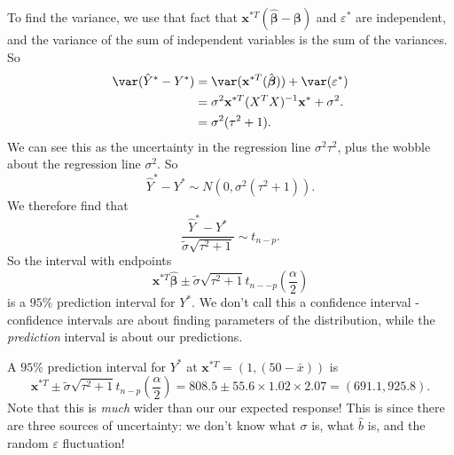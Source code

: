 \documentclass[a4paper]{article}
\begin{document}
To find the variance, we use that fact that $\mathbf{x}^{*T}(\hat{\boldsymbol\beta} - \boldsymbol\beta)$ and $\varepsilon^*$ are independent, and the variance of the sum of independent variables is the sum of the variances. So
\begin{align*}
  \var(\hat{Y}^* - Y^*) &= \var (\mathbf{x}^{*T}(\hat{\boldsymbol\beta})) + \var (\varepsilon^*)\\
  &= \sigma^2 \mathbf{x}^{*T}(X^TX)^{-1}\mathbf{x}^* + \sigma^2.\\
  &= \sigma^2(\tau^2 + 1).
\end{align*}
We can see this as the uncertainty in the regression line $\sigma^2\tau^2$, plus the wobble about the regression line $\sigma^2$. So
\[
  \hat{Y}^* - Y^* \sim N(0, \sigma^2(\tau^2 + 1)).
\]
We therefore find that
\[
  \frac{\hat{Y}^* - Y^*}{\tilde{\sigma}\sqrt{\tau^2 + 1}} \sim t_{n - p}.
\]
So the interval with endpoints
\[
  \mathbf{x}^{*T}\hat{\boldsymbol\beta} \pm \tilde{\sigma}\sqrt{\tau^2 + 1}t_{n- - p}\left(\frac{\alpha}{2}\right)
\]
is a $95\%$ prediction interval for $Y^*$. We don't call this a confidence interval - confidence intervals are about finding parameters of the distribution, while the \emph{prediction} interval is about our predictions.

\begin{eg}
  A $95\%$ prediction interval for $Y^*$ at $\mathbf{x}^{*T} = (1, (50 - \bar x))$ is
  \[
    \mathbf{x}^{*T}\pm \tilde{\sigma}\sqrt{\tau^2 + 1}t_{n - p}\left(\frac{\alpha}{2}\right) = 808.5\pm 55.6 \times 1.02 \times 2.07 = (691.1, 925.8).
  \]
  Note that this is \emph{much} wider than our our expected response! This is since there are three sources of uncertainty: we don't know what $\sigma$ is, what $\hat{b}$ is, and the random $\varepsilon$ fluctuation!
\end{eg}
\end{document}
